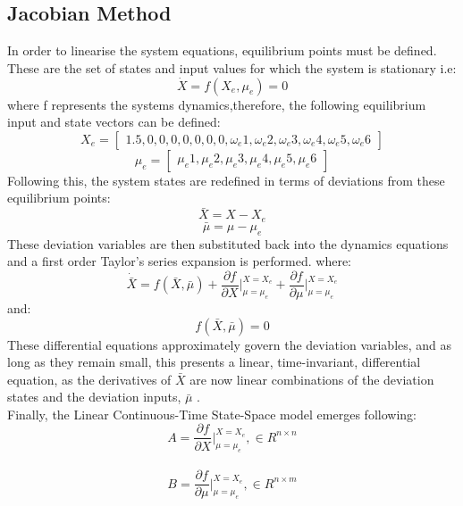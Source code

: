 \documentclass[12pt,a4paper,twoside]{report}
\begin{document}
			\subsection{Jacobian Method}
					
				In order to linearise the system equations, equilibrium points must be defined. These are the set of states and input values for which the system is stationary i.e:
					\[\dot{X} = f(X_e,\mu_e) = 0\]
				where f represents the systems dynamics,therefore, the following equilibrium input and state vectors can be defined:
				$$
					X_e = 
					\begin{bmatrix}
						1.5,0,0,0,0,0,0,0,\omega_e1,\omega_e2,\omega_e3,\omega_e4,\omega_e5,\omega_e6
					\end{bmatrix}
				$$
				$$
					\mu_e = 
					\begin{bmatrix}
						\mu_e1,\mu_e2,\mu_e3,\mu_e4,\mu_e5,\mu_e6
					\end{bmatrix}
				$$
				Following this, the system states are redefined in terms of deviations from these equilibrium points:
					\[\bar{X} = X - X_e\] 
					\[\bar{\mu} = \mu - \mu_e\] 
				These deviation variables are then substituted back into the dynamics equations and a first order Taylor's series expansion is performed. where:
				\begin{equation}
					\dot{\bar{X}} = f(\bar{X},\bar{\mu}) + \frac{\partial f}{\partial X}\bigg\vert_{\mu = \mu_e}^{X = X_e} + \frac{\partial f}{\partial \mu}\bigg\vert_{\mu = \mu_e}^{X = X_e}
				\end{equation}
				and:
					\[ f(\bar{X},\bar{\mu}) = 0 \]
				These differential equations approximately govern the deviation variables, and as long as they remain small, this presents a linear, time-invariant, differential equation, as the derivatives of $\bar{X}$ are now linear combinations of the deviation states and the deviation inputs, $\bar{\mu}$ \cite{11}. 
				\\
				Finally, the Linear Continuous-Time State-Space model emerges following:
				\\
				\begin{equation}
					A = \frac{\partial f}{\partial X}\bigg\vert_{\mu = \mu_e}^{X = X_e}, \in R ^{n\times n}
				\end{equation}
				\\
				\begin{equation}
					B = \frac{\partial f}{\partial \mu}\bigg\vert_{\mu = \mu_e}^{X = X_e} , \in R ^{n\times m}
				\end{equation} 
\end{document}
